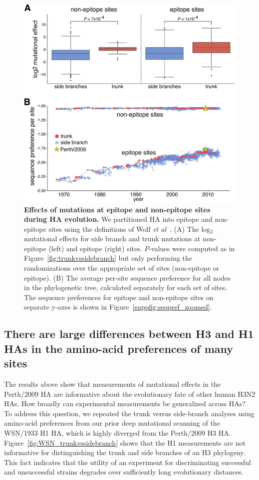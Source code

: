 \documentclass[9pt,twocolumn,twoside]{pnas-new}
\begin{document}
\begin{figure}
\centering
\includegraphics[width=\columnwidth]{figs/sequence_preference/sequence_preference.pdf}
\caption{\label{fig:sequence_preference}
{\bf Effects of mutations at epitope and non-epitope sites during HA evolution.}
We partitioned HA into epitope and non-epitope sites using the definitions of Wolf \textit{et al}~\cite{wolf2006long}.
(A) The log$_{2}$ mutational effects for side branch and trunk mutations at non-epitope (left) and epitope (right) sites.
$P$-values were computed as in Figure~\ref{fig:trunkvssidebranch} but only performing the randomizations over the appropriate set of sites (non-epitope or epitope).
(B) 
The average per-site sequence preference for all nodes in the phylogenetic tree, calculated separately for each set of sites.
The sequence preferences for epitope and non-epitope sites on separate y-axes is shown in Figure~\ref{suppfig:seqpref_zoomed}.
}
\end{figure}


\subsection*{There are large differences between H3 and H1 HAs in the amino-acid preferences of many sites}
The results above show that measurements of mutational effects in the Perth/2009 HA are informative about the evolutionary fate of other human H3N2 HAs.
How broadly can experimental measurements be generalized across HAs?
To address this question, we repeated the trunk versus side-branch analyses using amino-acid preferences from our prior deep mutational scanning of the WSN/1933 H1 HA, which is highly diverged from the Perth/2009 H3 HA.
Figure~\ref{fig:WSN_trunkvssidebranch} shows that the H1 measurements are not informative for distinguishing the trunk and side branches of an H3 phylogeny.
This fact indicates that the utility of an experiment for discriminating successful and unsuccessful strains degrades over sufficiently long evolutionary distances. 
\end{document}
